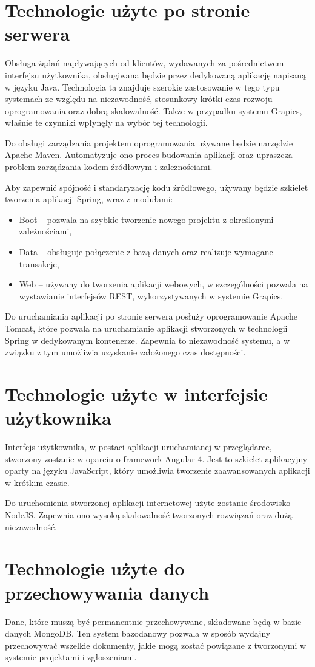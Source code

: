\documentclass[12pt, oneside, final]{report}
\begin{document}
\section{Technologie użyte po stronie serwera}
Obsługa żądań napływających od klientów, wydawanych za pośrednictwem interfejsu użytkownika, obsługiwana będzie przez dedykowaną aplikację napisaną w języku Java. Technologia ta znajduje szerokie zastosowanie w tego typu systemach ze względu na niezawodność, stosunkowy krótki czas rozwoju oprogramowania oraz dobrą skalowalność. Także w przypadku systemu Grapics, właśnie te czynniki wpłynęły na wybór tej technologii.

Do obsługi zarządzania projektem oprogramowania używane będzie narzędzie Apache Maven. Automatyzuje ono proces budowania aplikacji oraz upraszcza problem zarządzania kodem źródłowym i zależnościami.

Aby zapewnić spójność i standaryzację kodu źródłowego, używany będzie szkielet tworzenia aplikacji Spring, wraz z modułami:
\begin{itemize}
	\item Boot -- pozwala na szybkie tworzenie nowego projektu z określonymi zależnościami,
	\item Data -- obsługuje połączenie z bazą danych oraz realizuje wymagane transakcje,
	\item Web -- używany do tworzenia aplikacji webowych, w szczególności pozwala na wystawianie interfejsów REST, wykorzystywanych w systemie Grapics.
\end{itemize}
Do uruchamiania aplikacji po stronie serwera posłuży oprogramowanie Apache Tomcat, które pozwala na uruchamianie aplikacji stworzonych w technologii Spring w dedykowanym kontenerze. Zapewnia to niezawodność systemu, a w związku z tym umożliwia uzyskanie założonego czas dostępności.

\section{Technologie użyte w interfejsie użytkownika}
Interfejs użytkownika, w postaci aplikacji uruchamianej w przeglądarce, stworzony zostanie w oparciu o framework Angular 4. Jest to szkielet aplikacyjny oparty na języku JavaScript, który umożliwia tworzenie zaawansowanych aplikacji w krótkim czasie. 

Do uruchomienia stworzonej aplikacji internetowej użyte zostanie środowisko NodeJS. Zapewnia ono wysoką skalowalność tworzonych rozwiązań oraz dużą niezawodność.
\section{Technologie użyte do przechowywania danych}
Dane, które muszą być permanentnie przechowywane, składowane będą w bazie danych MongoDB. Ten system bazodanowy pozwala w sposób wydajny przechowywać wszelkie dokumenty, jakie mogą zostać powiązane z tworzonymi w systemie projektami i zgłoszeniami.
\end{document}
